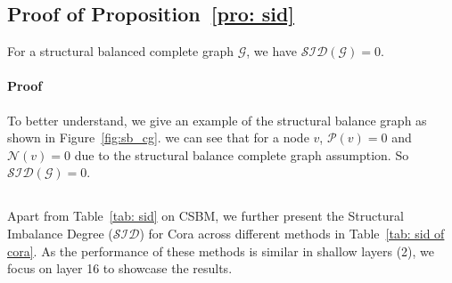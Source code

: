 \subsection{Proof of Proposition~\ref{pro: sid}}
\label{app: prof of prop sid}
\begin{proposition}
\label{app_pro: sid}
For a structural balanced complete graph $\mathcal{G}$, we have $\mathcal{SID}(\mathcal{G})=0$.
\end{proposition}
\paragraph{Proof}
To better understand, we give an example of the structural balance graph as shown in Figure~\ref{fig:sb_cg}.
we can see that for a node $v$, $\mathcal{P}(v)=0$ and  $\mathcal{N}(v)=0$ due to the structural balance complete graph assumption. So $\mathcal{SID}(\mathcal{G})=0$.

\subsection{}
\label{app: obs of sid}
Apart from Table~\ref{tab: sid} on CSBM, we further present the Structural Imbalance Degree ($\mathcal{SID}$) for Cora across different methods in Table~\ref{tab: sid of cora}. As the performance of these methods is similar in shallow layers (2), we focus on layer 16 to showcase the results.

\begin{table}[htbp]
\centering
\caption{$\mathcal{SID}$ on Cora datasets. We implement all of the methods on SGC under 100 epochs and the accuracy is the result.}
\label{tab: sid of cora}
\end{table}

